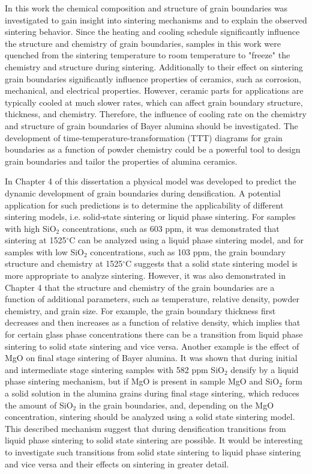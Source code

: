 In this work the chemical composition and structure of grain boundaries was investigated to gain insight into sintering mechanisms and to explain the observed sintering behavior. Since the heating and cooling schedule significantly influence the structure and chemistry of grain boundaries, samples in this work were quenched from the sintering temperature to room temperature to "freeze" the chemistry and structure during sintering. Additionally to their effect on sintering grain boundaries significantly influence properties of ceramics, such as corrosion, mechanical, and electrical properties. However, ceramic parts for applications are typically cooled at much slower rates, which can affect grain boundary structure, thickness, and chemistry. Therefore, the influence of cooling rate on the chemistry and structure of grain boundaries of Bayer alumina should be investigated. The development of time-temperature-transformation (TTT) diagrams for grain boundaries \cite{Cantwell2016} as a function of powder chemistry could be a powerful tool to design grain boundaries and tailor the properties of alumina ceramics. 

In Chapter 4 of this dissertation a physical model was developed to predict the dynamic development of grain boundaries during densification. A potential application for such predictions is to determine the applicability of different sintering models, i.e. solid-state sintering or liquid phase sintering. For samples with high SiO$_{2}$ concentrations, such as 603 ppm, it was demonstrated that sintering at 1525$^{\circ}$C can be analyzed using a liquid phase sintering model, and for samples with low SiO$_{2}$ concentrations, such as 103 ppm, the grain boundary structure and chemistry at 1525$^{\circ}$C suggests that a solid state sintering model is more appropriate to analyze sintering. However, it was also demonstrated in Chapter 4 that the structure and chemistry of the grain boundaries are a function of additional parameters, such as temperature, relative density, powder chemistry, and grain size. For example, the grain boundary thickness first decreases and then increases as a function of relative density, which implies that for certain glass phase concentrations there can be a transition from liquid phase sintering to solid state sintering and vice versa. Another example is the effect of MgO on final stage sintering of Bayer alumina. It was shown that during initial and intermediate stage sintering samples with 582 ppm SiO$_{2}$ densify by a liquid phase sintering mechanism, but if MgO is present in sample MgO and SiO$_{2}$ form a solid solution in the alumina grains during final stage sintering, which reduces the amount of SiO$_{2}$ in the grain boundaries, and, depending on the MgO concentration, sintering should be analyzed using a solid state sintering model. This described mechanism suggest that during densification transitions from liquid phase sintering to solid state sintering are possible. It would be interesting to investigate such transitions from solid state sintering to liquid phase sintering and vice versa and their effects on sintering in greater detail. 
